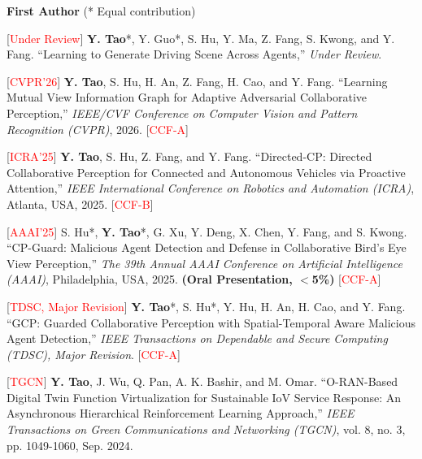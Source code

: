 \documentclass[letterpaper,11pt]{article}
\begin{document}
{{{{{{\large\textbf{First Author} (* Equal contribution)

\begin{justify}
    \normalsize
    [\textcolor{red}{Under Review}] \textbf{Y. Tao}*, Y. Guo*, S. Hu, Y. Ma, Z. Fang, S. Kwong, and Y. Fang. ``Learning to Generate Driving Scene Across Agents,'' \textit{Under Review}.
\end{justify}

\begin{justify}
    \normalsize
    [\textcolor{red}{CVPR'26}] \textbf{Y. Tao}, S. Hu, H. An, Z. Fang, H. Cao, and Y. Fang. ``Learning Mutual View Information Graph for Adaptive Adversarial Collaborative Perception,'' \textit{IEEE/CVF Conference on Computer Vision and Pattern Recognition (CVPR)}, 2026. [\textcolor{red}{CCF-A}]
\end{justify}

\begin{justify}
    \normalsize
    [\textcolor{red}{ICRA'25}] \textbf{Y. Tao}, S. Hu, Z. Fang, and Y. Fang. ``Directed-CP: Directed Collaborative Perception for Connected and Autonomous Vehicles via Proactive Attention,'' \textit{IEEE International Conference on Robotics and Automation (ICRA)}, Atlanta, USA, 2025. [\textcolor{red}{CCF-B}]
\end{justify}

\begin{justify}
    \normalsize
    [\textcolor{red}{AAAI'25}] S. Hu*, \textbf{Y. Tao}*, G. Xu, Y. Deng, X. Chen, Y. Fang, and S. Kwong. ``CP-Guard: Malicious Agent Detection and Defense in Collaborative Bird's Eye View Perception,'' \textit{The 39th Annual AAAI Conference on Artificial Intelligence (AAAI)}, Philadelphia, USA, 2025. \textbf{(Oral Presentation, $<$5\%)} [\textcolor{red}{CCF-A}]
\end{justify}

\begin{justify}
    \normalsize
    [\textcolor{red}{TDSC, Major Revision}] \textbf{Y. Tao}*, S. Hu*, Y. Hu, H. An, H. Cao, and Y. Fang. ``GCP: Guarded Collaborative Perception with Spatial-Temporal Aware Malicious Agent Detection,'' \textit{IEEE Transactions on Dependable and Secure Computing (TDSC), Major Revision}. [\textcolor{red}{CCF-A}]
\end{justify}

\begin{justify}
    \normalsize
    [\textcolor{red}{TGCN}] \textbf{Y. Tao}, J. Wu, Q. Pan, A. K. Bashir, and M. Omar. ``O-RAN-Based Digital Twin Function Virtualization for Sustainable IoV Service Response: An Asynchronous Hierarchical Reinforcement Learning Approach,'' \textit{IEEE Transactions on Green Communications and Networking (TGCN)}, vol. 8, no. 3, pp. 1049-1060, Sep. 2024.
\end{justify}

}}}}}}
\end{document}
